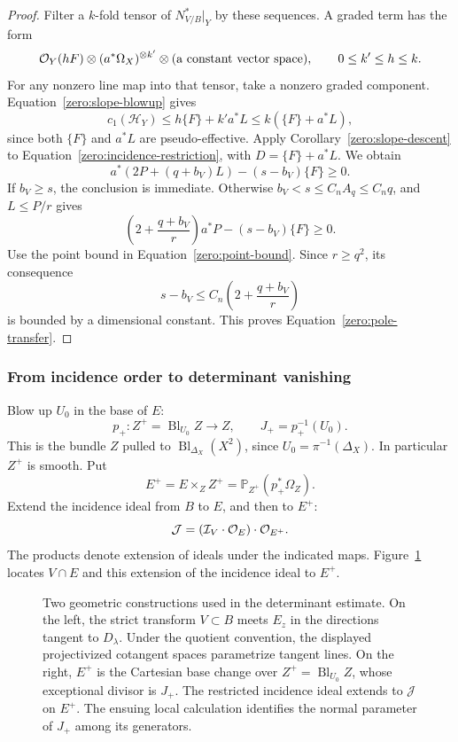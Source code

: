 \begin{proof}
Filter a \(k\)-fold tensor of \(N^*_{V/B}|_Y\) by these sequences.  A
graded term has the form
\[
 \mathcal O_Y(hF)\otimes(a^*\Omega_X)^{\otimes k'}
          \otimes(\text{a constant vector space}),
 \qquad 0\le k'\le h\le k.
\]
For any nonzero line map into that tensor, take a nonzero graded
component.  Equation~\eqref{zero:slope-blowup} gives
\[
 c_1(\mathscr H_Y)\le h\{F\}+k'a^*L
                 \le k(\{F\}+a^*L),
\]
since both \(\{F\}\) and \(a^*L\) are pseudo-effective.  Apply
Corollary~\ref{zero:slope-descent} to
Equation~\eqref{zero:incidence-restriction}, with
\(D=\{F\}+a^*L\).  We obtain
\begin{equation}\label{zero:incidence-base}
 a^*(2P+(q+b_V)L)-(s-b_V)\{F\}\ge0.
\end{equation}
If \(b_V\ge s\), the conclusion is immediate.  Otherwise
\(b_V<s\le C_nA_q\le C_nq\), and \(L\le P/r\) gives
\[
 \left(2+\frac{q+b_V}{r}\right)a^*P-(s-b_V)\{F\}\ge0.
\]
Use the point bound in Equation~\eqref{zero:point-bound}.  Since \(r\ge q^2\), its
consequence
\[
 s-b_V\le C_n\left(2+\frac{q+b_V}{r}\right)
\]
is bounded by a dimensional constant.  This proves
Equation~\eqref{zero:pole-transfer}.
\end{proof}

\subsubsection{From incidence order to determinant vanishing}

Blow up \(U_0\) in the base of \(E\):
\[
 p_+:Z^+=\operatorname{Bl}_{U_0}Z\longrightarrow Z,\qquad J_+=p_+^{-1}(U_0).
\]
This is the bundle \(Z\) pulled to \(\operatorname{Bl}_{\Delta_X}(X^2)\), since
\(U_0=\pi^{-1}(\Delta_X)\).  In particular \(Z^+\) is smooth.  Put
\[
 E^+=E\times_Z Z^+=\mathbb{P}_{Z^+}(p_+^*\Omega_Z).
\]
Extend the incidence ideal from \(B\) to \(E\), and then to \(E^+\):
\[
 \mathcal J=(\mathcal I_V\cdot\mathcal O_E)\cdot\mathcal O_{E^+}.
\]
The products denote extension of ideals under the indicated maps.
Figure~\ref{zero:two-diagonals} locates \(V\cap E\) and this extension of
the incidence ideal to \(E^+\).

\begin{figure}[ht]
\centering

\caption{Two geometric constructions used in the determinant estimate.
On the left, the strict transform \(V\subset B\) meets \(E_z\) in the
directions tangent to \(D_\lambda\).  Under the quotient convention,
the displayed projectivized cotangent spaces parametrize tangent lines.
On the right, \(E^+\) is the Cartesian base change
over \(Z^+=\operatorname{Bl}_{U_0}Z\), whose exceptional divisor is \(J_+\).
The restricted incidence ideal extends to \(\mathcal J\) on \(E^+\).
The ensuing local calculation identifies the normal parameter of \(J_+\)
among its generators.}
\label{zero:two-diagonals}
\end{figure}

